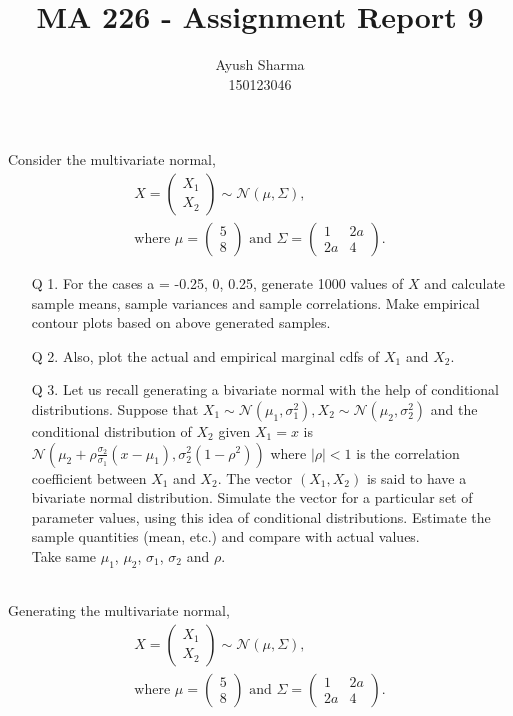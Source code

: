 \documentclass[11pt]{article}
\title{MA 226 - Assignment Report 9}
\author{Ayush Sharma\\150123046}
\begin{document}
\titlepage
\newpage
Consider the multivariate normal,
\begin{align*}
	X = \begin{pmatrix}X_{1}\\X_{2}\end{pmatrix} \sim \mathcal{N}(\mu, \Sigma),\nonumber\\
	\text{where } \mu = \begin{pmatrix}5\\8\end{pmatrix} \text{ and } \Sigma = \begin{pmatrix}1 & 2a\\2a & 4\end{pmatrix}.\nonumber
\end{align*}
\begin{enumerate}
\item[Q 1.] For the cases a = -0.25, 0, 0.25, generate 1000 values of $X$ and calculate sample means, sample variances and sample correlations. Make empirical contour plots based on above generated samples.

\item[Q 2.] Also, plot the actual and empirical marginal cdfs of $X_1$ and $X_2$.

\item[Q 3.] Let us recall generating a bivariate normal with the help of conditional distributions.
Suppose that $X_1 \sim \mathcal{N}(\mu_1,\sigma_{1}^{2}), X_2 \sim \mathcal{N}(\mu_2,\sigma_{2}^{2})$ and the conditional distribution of $X_2$ given $X_1 = x$ is $\mathcal{N}(\mu_2 + \rho\frac{\sigma_2}{\sigma_1}(x - \mu_1),\sigma_{2}^{2}(1 - \rho^2))$ where $|\rho| < 1$ is the correlation coefficient between $X_1$ and $X_2$. The vector $(X_1, X_2)$ is said to have a bivariate normal distribution. Simulate the vector for a particular set of parameter values, using this idea of conditional distributions. Estimate the sample quantities (mean, etc.) and compare with actual values.
\\Take same $\mu_1$, $\mu_2$, $\sigma_1$, $\sigma_2$ and $\rho$.
\end{enumerate}
\newpage
{}\\
Generating the multivariate normal,
\begin{align*}
	X = \begin{pmatrix}X_{1}\\X_{2}\end{pmatrix} \sim \mathcal{N}(\mu, \Sigma),\nonumber\\
	\text{where } \mu = \begin{pmatrix}5\\8\end{pmatrix} \text{ and } \Sigma = \begin{pmatrix}1 & 2a\\2a & 4\end{pmatrix}.\nonumber
\end{align*}
\end{document}
